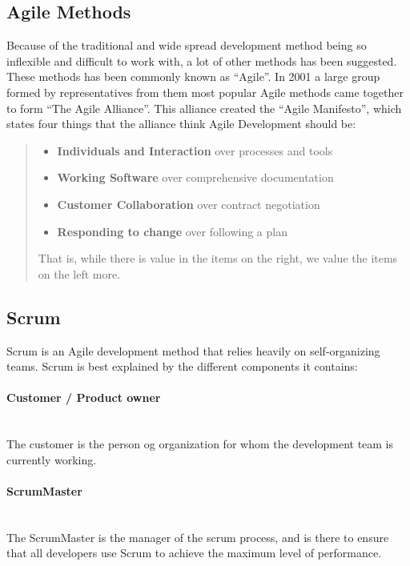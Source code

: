 \subsection{Agile Methods}

Because of the traditional and wide spread development method being so inflexible and difficult to work with, a lot of other methods has been suggested. These methods has been commonly known as ``Agile''. In 2001 a large group formed by representatives from them most popular Agile methods came together to form ``The Agile Alliance''. This alliance created the ``Agile Manifesto'', which states four things that the alliance think Agile Development should be:

\begin{quotation}
	\begin{itemize}
	\item \textbf{Individuals and Interaction} over processes and tools
	\item \textbf{Working Software} over comprehensive documentation
	\item \textbf{Customer Collaboration} over contract negotiation
	\item \textbf{Responding to change} over following a plan
\end{itemize}

That is, while there is value in the items on the right, we value the items on the left more.
\end{quotation}

\subsection{Scrum}
Scrum is an Agile development method that relies heavily on self-organizing teams. Scrum is best explained by the different components it contains:

\paragraph{Customer / Product owner}\ \\
The customer is the person og organization for whom the development team is currently working.

\paragraph{ScrumMaster}\ \\
The ScrumMaster is the manager of the scrum process, and is there to ensure that all developers use Scrum to achieve the maximum level of performance.


